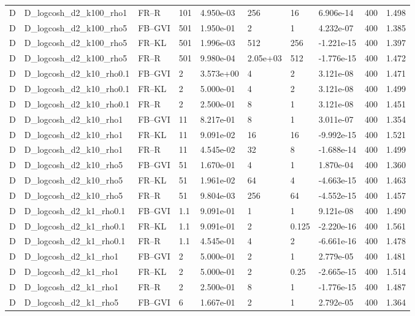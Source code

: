 \begin{tabular}{llllllllll}
D & D\_logcosh\_d2\_k100\_rho1 & FR--R & 101 & 4.950e-03 & 256 & 16 & 6.906e-14 & 400 & 1.498 \\
D & D\_logcosh\_d2\_k100\_rho5 & FB--GVI & 501 & 1.950e-01 & 2 & 1 & 4.232e-07 & 400 & 1.385 \\
D & D\_logcosh\_d2\_k100\_rho5 & FR--KL & 501 & 1.996e-03 & 512 & 256 & -1.221e-15 & 400 & 1.397 \\
D & D\_logcosh\_d2\_k100\_rho5 & FR--R & 501 & 9.980e-04 & 2.05e+03 & 512 & -1.776e-15 & 400 & 1.472 \\
D & D\_logcosh\_d2\_k10\_rho0.1 & FB--GVI & 2 & 3.573e+00 & 4 & 2 & 3.121e-08 & 400 & 1.471 \\
D & D\_logcosh\_d2\_k10\_rho0.1 & FR--KL & 2 & 5.000e-01 & 4 & 2 & 3.121e-08 & 400 & 1.499 \\
D & D\_logcosh\_d2\_k10\_rho0.1 & FR--R & 2 & 2.500e-01 & 8 & 1 & 3.121e-08 & 400 & 1.451 \\
D & D\_logcosh\_d2\_k10\_rho1 & FB--GVI & 11 & 8.217e-01 & 8 & 1 & 3.011e-07 & 400 & 1.354 \\
D & D\_logcosh\_d2\_k10\_rho1 & FR--KL & 11 & 9.091e-02 & 16 & 16 & -9.992e-15 & 400 & 1.521 \\
D & D\_logcosh\_d2\_k10\_rho1 & FR--R & 11 & 4.545e-02 & 32 & 8 & -1.688e-14 & 400 & 1.499 \\
D & D\_logcosh\_d2\_k10\_rho5 & FB--GVI & 51 & 1.670e-01 & 4 & 1 & 1.870e-04 & 400 & 1.360 \\
D & D\_logcosh\_d2\_k10\_rho5 & FR--KL & 51 & 1.961e-02 & 64 & 4 & -4.663e-15 & 400 & 1.463 \\
D & D\_logcosh\_d2\_k10\_rho5 & FR--R & 51 & 9.804e-03 & 256 & 64 & -4.552e-15 & 400 & 1.457 \\
D & D\_logcosh\_d2\_k1\_rho0.1 & FB--GVI & 1.1 & 9.091e-01 & 1 & 1 & 9.121e-08 & 400 & 1.490 \\
D & D\_logcosh\_d2\_k1\_rho0.1 & FR--KL & 1.1 & 9.091e-01 & 2 & 0.125 & -2.220e-16 & 400 & 1.561 \\
D & D\_logcosh\_d2\_k1\_rho0.1 & FR--R & 1.1 & 4.545e-01 & 4 & 2 & -6.661e-16 & 400 & 1.478 \\
D & D\_logcosh\_d2\_k1\_rho1 & FB--GVI & 2 & 5.000e-01 & 2 & 1 & 2.779e-05 & 400 & 1.481 \\
D & D\_logcosh\_d2\_k1\_rho1 & FR--KL & 2 & 5.000e-01 & 2 & 0.25 & -2.665e-15 & 400 & 1.514 \\
D & D\_logcosh\_d2\_k1\_rho1 & FR--R & 2 & 2.500e-01 & 8 & 1 & -1.776e-15 & 400 & 1.487 \\
D & D\_logcosh\_d2\_k1\_rho5 & FB--GVI & 6 & 1.667e-01 & 2 & 1 & 2.792e-05 & 400 & 1.364 \\

\end{tabular}
